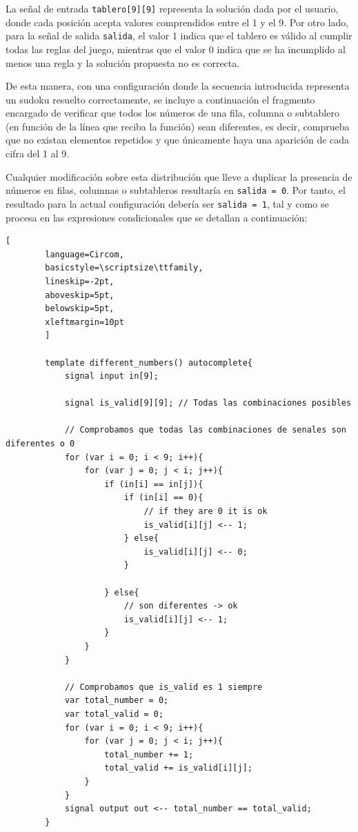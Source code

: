 \documentclass[a4paper,12pt]{report}
\begin{document}
	\endgroup
	
	\vspace{0.2cm}
	\noindent La señal de entrada \texttt{tablero[9][9]} representa la solución dada por el usuario, donde cada posición acepta valores comprendidos entre el 1 y el 9. Por otro lado, para la señal de salida \texttt{salida}, el valor 1 indica que el tablero es válido al cumplir todas las reglas del juego, mientras que el valor 0 indica que se ha incumplido al menos una regla y la solución propuesta no es correcta.
	
	\vspace{0.4cm}
	\noindent De esta manera, con una configuración donde la secuencia introducida representa un sudoku resuelto correctamente, se incluye a continuación el fragmento encargado de verificar que todos los números de una fila, columna o subtablero (en función de la línea que reciba la función) sean diferentes, es decir, comprueba que no existan elementos repetidos y que únicamente haya una aparición de cada cifra del 1 al 9. 
	
	\vspace{0.4cm}
	\noindent Cualquier modificación sobre esta distribución que lleve a duplicar la presencia de números en filas, columnas o subtableros resultaría en \texttt{salida = 0}. Por tanto, el resultado para la actual configuración debería ser \texttt{salida = 1}, tal y como se procesa en las expresiones condicionales que se detallan a continuación:
	
	\vspace{0.2cm}
	\begin{lstlisting}[
		language=Circom,
		basicstyle=\scriptsize\ttfamily, 
		lineskip=-2pt,                  
		aboveskip=5pt,                  
		belowskip=5pt,                  
		xleftmargin=10pt
		]
		
		template different_numbers() autocomplete{
			signal input in[9];
			
			signal is_valid[9][9]; // Todas las combinaciones posibles
			
			// Comprobamos que todas las combinaciones de senales son diferentes o 0 
			for (var i = 0; i < 9; i++){
				for (var j = 0; j < i; j++){     
					if (in[i] == in[j]){
						if (in[i] == 0){
							// if they are 0 it is ok
							is_valid[i][j] <-- 1;
						} else{
							is_valid[i][j] <-- 0;
						}
						
					} else{
						// son diferentes -> ok
						is_valid[i][j] <-- 1;
					}
				}
			} 
			
			// Comprobamos que is_valid es 1 siempre
			var total_number = 0;
			var total_valid = 0;
			for (var i = 0; i < 9; i++){
				for (var j = 0; j < i; j++){
					total_number += 1;
					total_valid += is_valid[i][j];
				}
			}
			signal output out <-- total_number == total_valid;
		}
	\end{lstlisting}
	
\end{document}
